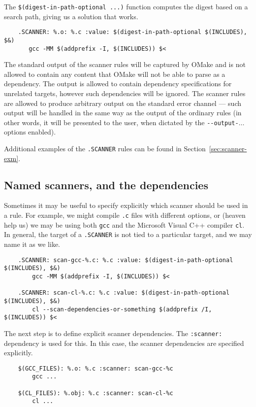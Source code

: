 The \verb+$(digest-in-path-optional ...)+ function computes the digest based on a search path,
giving us a solution that works.

\begin{verbatim}
    .SCANNER: %.o: %.c :value: $(digest-in-path-optional $(INCLUDES), $&)
       gcc -MM $(addprefix -I, $(INCLUDES)) $<
\end{verbatim}

The standard output of the scanner rules will be captured by OMake and is not allowed to contain any
content that OMake will not be able to parse as a dependency. The output is allowed to contain
dependency specifications for unrelated targets, however such dependencies will be ignored. The
scanner rules are allowed to produce arbitrary output on the standard error channel --- such output
will be handled in the same way as the output of the ordinary rules (in other words, it will be
presented to the user, when dictated by the \verb+--output-+$\ldots$ options enabled).

Additional examples of the \verb+.SCANNER+ rules can be found in Section~\ref{sec:scanner-exm}.

\subsection{Named scanners, and the  dependencies}

Sometimes it may be useful to specify explicitly which scanner should be used in a rule.  For
example, we might compile \verb+.c+ files with different options, or (heaven help us) we may be
using both \verb+gcc+ and the Microsoft Visual C++ compiler \verb+cl+. In general, the target of a
\verb+.SCANNER+ is not tied to a particular target, and we may name it as we like.

\begin{verbatim}
    .SCANNER: scan-gcc-%.c: %.c :value: $(digest-in-path-optional $(INCLUDES), $&)
        gcc -MM $(addprefix -I, $(INCLUDES)) $<

    .SCANNER: scan-cl-%.c: %.c :value: $(digest-in-path-optional $(INCLUDES), $&)
        cl --scan-dependencies-or-something $(addprefix /I, $(INCLUDES)) $<
\end{verbatim}

The next step is to define explicit scanner dependencies.  The \verb+:scanner:+ dependency is used
for this.  In this case, the scanner dependencies are specified explicitly.

\begin{verbatim}
    $(GCC_FILES): %.o: %.c :scanner: scan-gcc-%c
        gcc ...

    $(CL_FILES): %.obj: %.c :scanner: scan-cl-%c
        cl ...
\end{verbatim}

